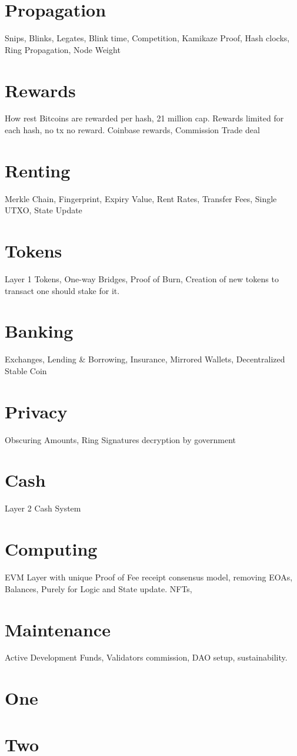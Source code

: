 \documentclass[a4paper,10pt]{article}
\begin{document}
\section{Propagation}
Snips, Blinks, Legates, Blink time, Competition, Kamikaze Proof, Hash clocks, Ring Propagation, Node Weight

\section{Rewards}
How rest Bitcoins are rewarded per hash, 21 million cap. Rewards limited for each hash, no tx no reward. Coinbase rewards, Commission Trade deal

\section{Renting}
Merkle Chain, Fingerprint, Expiry Value, Rent Rates, Transfer Fees, Single UTXO, State Update

\section{Tokens}
Layer 1 Tokens, One-way Bridges, Proof of Burn, Creation of new tokens to transact one should stake for it.

\section{Banking}
Exchanges, Lending \& Borrowing, Insurance, Mirrored Wallets, Decentralized Stable Coin

\section{Privacy}
Obscuring Amounts, Ring Signatures decryption by government

\section{Cash}
Layer 2 Cash System 

\section{Computing}
EVM Layer with unique Proof of Fee receipt consensus model, removing EOAs, Balances, Purely for Logic and State update. NFTs, 

\section{Maintenance}
Active Development Funds, Validators commission, DAO setup, sustainability.


\appendix

\section{One}

\section{Two}
\end{document}
